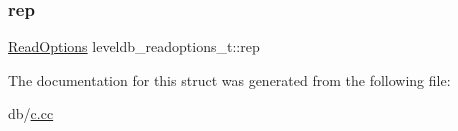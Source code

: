 \subsubsection{\texorpdfstring{rep}{rep}}
{\footnotesize\ttfamily \mbox{\hyperlink{structleveldb_1_1_read_options}{Read\+Options}} leveldb\+\_\+readoptions\+\_\+t\+::rep}



The documentation for this struct was generated from the following file\+:\begin{DoxyCompactItemize}
\item 
db/\mbox{\hyperlink{c_8cc}{c.\+cc}}\end{DoxyCompactItemize}
